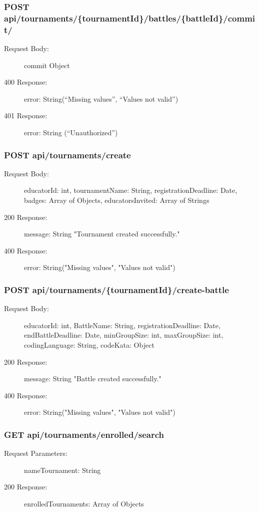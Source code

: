 \documentclass{Configuration_Files/Template}
\begin{document}
\subsubsection{POST api/tournaments/\{tournamentId\}/battles/\{battleId\}/commit/}
\begin{description}
    \item[Request Body:] commit Object
    \item[400 Response:] error: String(“Missing values”, “Values not valid”)
    \item[401 Response:] error: String (“Unauthorized”)
\end{description}

\subsubsection{POST api/tournaments/create}
\begin{description}
    \item[Request Body:] educatorId: int, tournamentName: String, registrationDeadline: Date, badges: Array of Objects, educatorsInvited: Array of Strings
    \item[200 Response:] message: String "Tournament created successfully."
    \item[400 Response:] error: String("Missing values", "Values not valid")
\end{description}

\subsubsection{POST api/tournaments/\{tournamentId\}/create-battle}
\begin{description}
    \item[Request Body:] educatorId: int, BattleName: String, registrationDeadline: Date, endBattleDeadline: Date, minGroupSize: int, maxGroupSize: int, codingLanguage: String, codeKata: Object
    \item[200 Response:] message: String "Battle created successfully."
    \item[400 Response:] error: String("Missing values", "Values not valid")
\end{description}

\subsubsection{GET api/tournaments/enrolled/search}
\begin{description}
    \item[Request Parameters:] nameTournament: String
    \item[200 Response:] enrolledTournaments: Array of Objects
\end{description}
\end{document}
